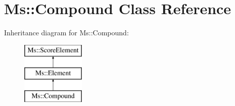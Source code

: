 \hypertarget{class_ms_1_1_compound}{}\section{Ms\+:\+:Compound Class Reference}
\label{class_ms_1_1_compound}
Inheritance diagram for Ms\+:\+:Compound\+:\begin{figure}[H]
\begin{center}
\leavevmode
\includegraphics[height=3.000000cm]{class_ms_1_1_compound}
\end{center}
\end{figure}
